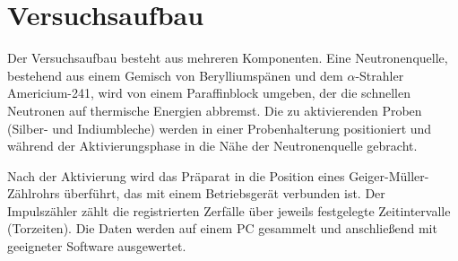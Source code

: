 \section{Versuchsaufbau}
\label{sec:Versucshaufbau}

Der Versuchsaufbau besteht aus mehreren Komponenten. Eine Neutronenquelle, bestehend aus einem Gemisch von Berylliumspänen und dem $\alpha$-Strahler Americium-241, wird von einem Paraffinblock umgeben, der die schnellen Neutronen auf thermische Energien abbremst. Die zu aktivierenden Proben (Silber- und Indiumbleche) werden in einer Probenhalterung positioniert und während der Aktivierungsphase in die Nähe der Neutronenquelle gebracht.

Nach der Aktivierung wird das Präparat in die Position eines Geiger-Müller-Zählrohrs überführt, das mit einem Betriebsgerät verbunden ist. Der Impulszähler zählt die registrierten Zerfälle über jeweils festgelegte Zeitintervalle (Torzeiten). Die Daten werden auf einem PC gesammelt und anschließend mit geeigneter Software ausgewertet.


